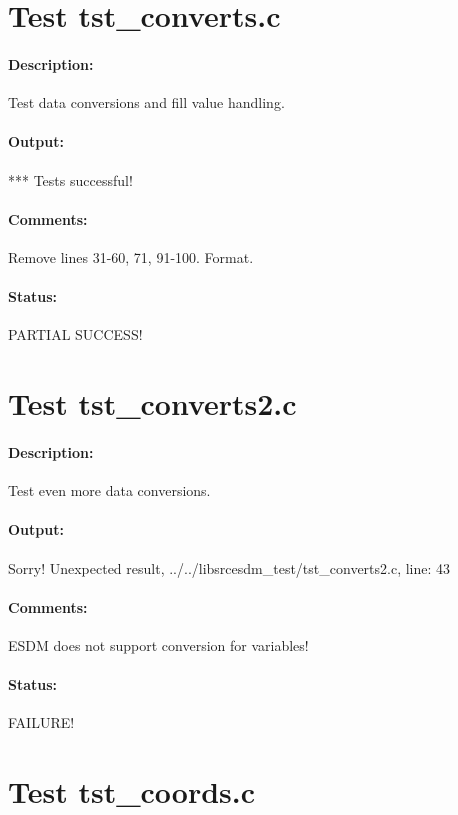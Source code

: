 \section{Test tst\_converts.c}

\paragraph{Description:} Test data conversions and fill value handling.

\paragraph{Output:} *** Tests successful!

\paragraph{Comments:} Remove lines 31-60, 71, 91-100. Format.

\paragraph{Status:} PARTIAL SUCCESS!

\section{Test tst\_converts2.c}

\paragraph{Description:} Test even more data conversions.

\paragraph{Output:} Sorry! Unexpected result, ../../libsrcesdm\_test/tst\_converts2.c, line: 43

\paragraph{Comments:} ESDM does not support conversion for variables!

\paragraph{Status:} FAILURE!

\section{Test tst\_coords.c}

